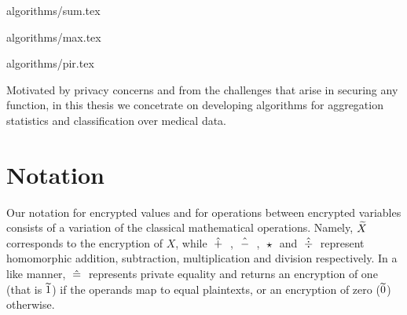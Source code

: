 {algorithms/sum.tex}


{algorithms/max.tex}


{algorithms/pir.tex}



Motivated by privacy concerns and from the challenges that arise in securing any function, in this thesis we concetrate on developing algorithms for aggregation statistics and classification over medical data.  


\section{Notation}\label{s:notation}
Our notation for encrypted values and for operations between encrypted variables consists of a variation of the classical mathematical operations.
Namely, $\widetilde{X}$ corresponds to the encryption of $X$, while $\;\hat{+}\;$ , $\;\hat{-}\;$ , $\;\star\;$ and $\;\hat{\div}\;$ represent homomorphic addition, subtraction, multiplication and division respectively.
In a like manner, $\;\hat{=}\;$ represents private equality and returns an encryption of one (that is $\widetilde{1}$) if the operands map to equal plaintexts, or an encryption of zero ($\widetilde{0}$) otherwise.





